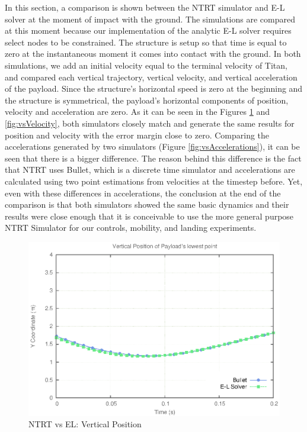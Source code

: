 In this section, a comparison is shown between the NTRT simulator and E-L solver at the moment of impact with the ground. 
The simulations are compared at this moment because our implementation of the analytic E-L solver requires select nodes to be constrained.
The structure is setup so that time is equal to zero at the instantaneous moment it comes into contact with the ground. 
In both simulations, we add an initial velocity equal to the terminal velocity of Titan, and compared each vertical trajectory, vertical velocity, and vertical acceleration of the payload. 
Since the structure's horizontal speed is zero at the beginning and the structure is symmetrical, the payload's horizontal components of position, velocity and acceleration are zero. 
As it can be seen in the Figures \ref{fig:vsPosition} and \ref{fig:vsVelocity}, both simulators closely match and generate the same results for position and velocity with the error margin close to zero. 
Comparing the accelerations generated by two simulators (Figure \ref{fig:vsAccelerations}), it can be seen that there is a bigger difference. 
The reason behind this difference is the fact that NTRT uses Bullet, which is a discrete time simulator and accelerations are calculated using two point estimations from velocities at the timestep before.  Yet, even with these differences in accelerations, the conclusion at the end of the comparison is that both simulators showed the same basic dynamics and their results were close enough that it is conceivable to use the more general purpose NTRT Simulator for our controls, mobility, and landing experiments.


\begin{figure}[htb]
   \centering
   \includegraphics[width=0.8\columnwidth]{tex/images/landing/bulletVsEL/SimVsEL}
   \caption{NTRT vs EL: Vertical Position}
   \label{fig:vsPosition}
\end{figure}

